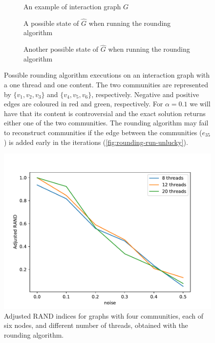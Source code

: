 \begin{figure}
	\begin{center}
		\begin{subfigure}{0.3\textwidth}
			\centering
			\caption{An example of interaction graph $G$}
			\label{fig:rounding-interaction-graph-example}
		\end{subfigure}
		\quad
		\begin{subfigure}{0.3\textwidth}
			\centering
			\caption{A possible state of $\hat{G}$ when running the rounding
				algorithm}
			\label{fig:rounding-run-unlucky}
		\end{subfigure}
		\quad
		\begin{subfigure}{0.3\textwidth}
			\centering
			\caption{Another possible state of $\hat{G}$ when running the
				rounding algorithm}
			\label{fig:rounding-run-lucky}
		\end{subfigure}
	\end{center}
	\caption[An interaction graph with a single thread and content and two
		possible iterations of the rounding algorithm]{Possible rounding algorithm
		executions on an interaction graph with a
		one thread and one content. The two communities are represented by $\{ v_1, v_2,
			v_3\}$ and $\{ v_4, v_5, v_6\}$, respectively. Negative and
		positive edges are coloured in red and green, respectively.
		For $\alpha = 0.1$ we will have that its content is
		controversial and the exact solution returns either one of
		the two communities. The rounding algorithm may fail to reconstruct
		communities if the edge between the communities ($e_{35}$) is added early in
		the iterations (\autoref{fig:rounding-run-unlucky}).}
	\label{fig:rounding-example}
\end{figure}

\begin{figure}
	\centering
	\includegraphics[width=0.9\linewidth]{tex/out/synthetic/noise_adj_rand_threads.pdf}
	\caption[Adjusted RAND indices for graphs with different number of
		threads]{Adjusted RAND indices for graphs with four communities, each of
		six nodes, and different number of threads, obtained with the rounding
		algorithm.}
	\label{fig:clustering-threads}
\end{figure}

